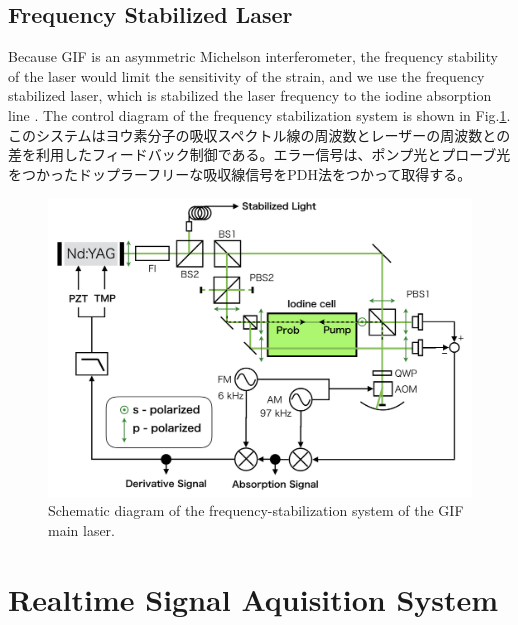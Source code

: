 \subsection{Frequency Stabilized Laser}
Because GIF is an asymmetric Michelson interferometer, the frequency stability of the laser would limit the sensitivity of the strain, and we use the frequency stabilized laser, which is stabilized the laser frequency to the iodine absorption line \cite{araya2002iodine}. The control diagram of the frequency stabilization system is shown in Fig.\ref{img:img417}. このシステムはヨウ素分子の吸収スペクトル線の周波数とレーザーの周波数との差を利用したフィードバック制御である。エラー信号は、ポンプ光とプローブ光をつかったドップラーフリーな吸収線信号\cite{snyder1980high}をPDH法をつかって取得する。

\begin{figure}[h]
  \begin{center}   
    \includegraphics[width=12cm]{./img_chap4/img417.png}
    \caption{Schematic diagram of the frequency-stabilization system of the GIF main laser.}\label{img:img417}
  \end{center}
\end{figure}

\section{Realtime Signal  Aquisition System} \label{sec:sec33}
